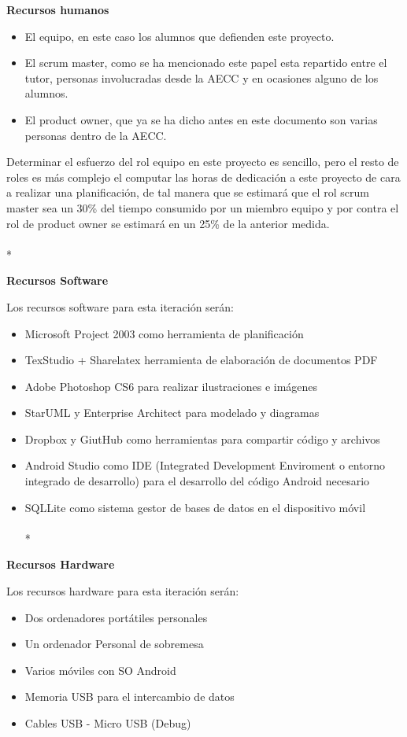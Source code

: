 \documentclass[../pfc.tex]{subfiles}
\begin{document}
	\textbf{Recursos humanos}
	
	\begin{itemize} 
		\item El equipo, en este caso los alumnos que defienden este proyecto. 
		\item El scrum master, como se ha mencionado este papel esta repartido entre el tutor, personas involucradas desde la AECC y en ocasiones alguno de los alumnos. 
		\item El product owner, que ya se ha dicho antes en este documento son varias personas dentro de la AECC. 
	\end{itemize}
	
	Determinar el esfuerzo del rol equipo en este proyecto es sencillo, pero el resto de roles es más complejo el computar las horas de dedicación a este proyecto de cara a realizar una planificación, de tal manera que se estimará que el rol scrum master sea un 30\% del tiempo consumido por un miembro equipo y por contra el rol de product owner se estimará en un 25\% de la anterior medida.\\\\*
	
	\textbf{Recursos Software}
	
	Los recursos software para esta iteración serán:
	\begin{itemize}
		\item Microsoft Project 2003 como herramienta de planificación
		\item TexStudio + Sharelatex herramienta de elaboración de documentos PDF
		\item Adobe Photoshop CS6 para realizar ilustraciones e imágenes
		\item StarUML y Enterprise Architect para modelado y diagramas
		\item Dropbox y GiutHub como herramientas para compartir código y archivos
		\item Android Studio como IDE (Integrated Development Enviroment o entorno integrado de desarrollo) para el desarrollo del código Android necesario
		\item SQLLite como sistema gestor de bases de datos en el dispositivo móvil\\\\*
	\end{itemize}
	
	\textbf{Recursos Hardware}
	
	Los recursos hardware para esta iteración serán:
	
	\begin{itemize}
		\item Dos ordenadores portátiles personales
		\item Un ordenador Personal de sobremesa
		\item Varios móviles con SO Android
		\item Memoria USB para el intercambio de datos
		\item Cables USB - Micro USB (Debug)
	\end{itemize}	
	
\end{document}

